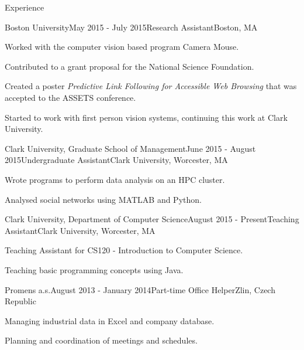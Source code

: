\documentclass{resume} %
\begin{document}
\begin{rSection}{Experience}

\begin{rSubsection}{Boston University}{May 2015 - July 2015}{Research Assistant}{Boston, MA}
\item Worked with the computer vision based program Camera Mouse.
\item Contributed to a grant proposal for the National Science Foundation.
\item Created a poster \emph{Predictive Link Following for Accessible Web Browsing} that was accepted to the ASSETS conference.
\item Started to work with first person vision systems, continuing this work at Clark University.
\end{rSubsection}


\begin{rSubsection}{Clark University, Graduate School of Management}{June 2015 - August 2015}{Undergraduate Assistant}{Clark University, Worcester, MA}
\item Wrote programs to perform data analysis on an HPC cluster.
\item Analysed social networks using MATLAB and Python.
\end{rSubsection}


\begin{rSubsection}{Clark University, Department of Computer Science}{August 2015 - Present}{Teaching Assistant}{Clark University, Worcester, MA}
\item Teaching Assistant for CS120 - Introduction to Computer Science.
\item Teaching basic programming concepts using Java.
\end{rSubsection}


\begin{rSubsection}{Promens a.s.}{August 2013 - January 2014}{Part-time Office Helper}{Zlin, Czech Republic}
\item Managing industrial data in Excel and company database.
\item Planning and coordination of meetings and schedules.
\end{rSubsection}

\end{rSection}
\end{document}
